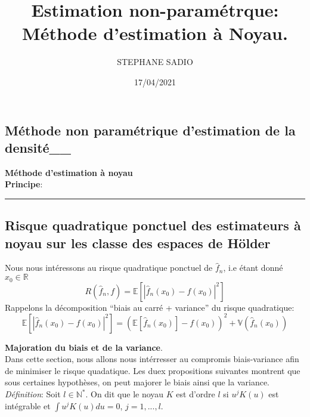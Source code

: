 \documentclass[
]{article}
\title{Estimation non-paramétrque: Méthode d'estimation à Noyau.}
\author{STEPHANE SADIO}
\date{17/04/2021}
\begin{document}
\maketitle

{
\setcounter{tocdepth}{3}
\tableofcontents
}
\hypertarget{muxe9thode-non-paramuxe9trique-destimation-de-la-densituxe9__}{%
\subsection{\texorpdfstring{Méthode non paramétrique d'estimation de la
densité\_\_\\
}{Méthode non paramétrique d'estimation de la densité\_\_ }}\label{muxe9thode-non-paramuxe9trique-destimation-de-la-densituxe9__}}

\textbf{Méthode d'estimation à noyau}\\
\textbf{Principe}:

\begin{center}\rule{0.5\linewidth}{0.5pt}\end{center}

\hypertarget{risque-quadratique-ponctuel-des-estimateurs-uxe0-noyau-sur-les-classe-des-espaces-de-huxf6lder}{%
\subsection{Risque quadratique ponctuel des estimateurs à noyau sur les
classe des espaces de
Hölder~}\label{risque-quadratique-ponctuel-des-estimateurs-uxe0-noyau-sur-les-classe-des-espaces-de-huxf6lder}}

Nous nous intéressons au risque quadratique ponctuel de \(\hat{f}_n\),
i.e étant donné \(x_0 \in \mathbb{R}\)
\[R(\hat {f}_n, f) = \mathbb{E}[|\hat {f}_n(x_0) - f(x_0)|^2]\]
Rappelons la décomposition ``biais au carré + variance'' du risque
quadratique:\\
\[
  \mathbb{E}[|\hat {f}_n(x_0) - f(x_0)|^2] = (\mathbb{E}[\hat {f}_n(x_0)] - f(x_0))^2 + \mathbb{V}(\hat {f}_n(x_0))
\]

\textbf{Majoration du biais et de la variance}.\\
Dans cette section, nous allons nous intérresser au compromis
biais-variance afin de minimiser le risque quadatique. Les duex
propositions suivantes montrent que sous certaines hypothèses, on peut
majorer le biais ainsi que la variance.\\

\emph{Définition}: Soit \(l \in \mathbb{N^*}\). On dit que le noyau
\(K\) est d'ordre \(l\) si \(u^jK(u)\) est intégrable et
\(\int u^jK(u)du = 0\), \(j = {1,...,l}\).\\
\end{document}
